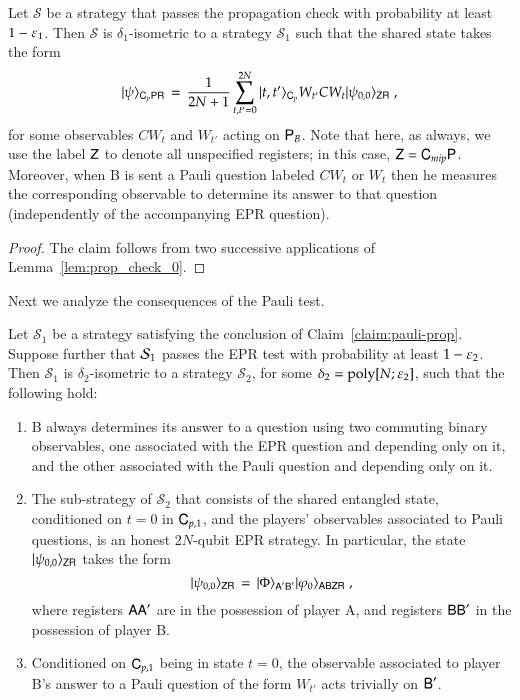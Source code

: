 \begin{claim}\label{claim:pauli-prop}
Let $\mathcal{S}$ be a strategy that passes the propagation check with probability at least $1 - \varepsilon_1$. Then $\mathcal{S}$ is $\delta_1$-isometric to a strategy $\mathcal{S}_1$ such that the shared state takes the form
\[ |\psi\rangle_{{\textsf{C}}_p {\textsf{PR}}} \,=\, \frac{1}{2N+1} \sum_{t,t'=0}^{2N} |t,t'\rangle_{{\textsf{C}}_p} W_{t'} CW_t | \psi_{0,0}\rangle_{{\textsf{ZR}}}\;, \]
for some observables $CW_t$ and $W_{t'}$ acting on ${\textsf{P}}_B$. Note that here, as always, we use the label ${\textsf{Z}}$ to denote all unspecified registers; in this case, ${\textsf{Z}} = {\textsf{C}}_{mip}{\textsf{P}}$. 
 Moreover, when B is sent a Pauli question labeled $CW_t$ or $W_t$ then he measures the corresponding observable to determine its answer to that question (independently of the accompanying EPR question). 
\end{claim}

\begin{proof}
The claim follows from two successive applications of Lemma~\ref{lem:prop_check_0}.
\end{proof}


Next we analyze the consequences of the Pauli test. 

\begin{claim}\label{claim:pauli-epr}
Let $\mathcal{S}_1$ be a strategy satisfying the conclusion of Claim~\ref{claim:pauli-prop}. Suppose further that $\mathcal{S}_1$ passes the EPR test with probability at least $1 - \varepsilon_2$. Then $\mathcal{S}_1$ is $\delta_2$-isometric to a strategy $\mathcal{S}_2$, for some $\delta_2 = \operatorname{poly}[N;\varepsilon_2]$, such that the following hold:
\begin{enumerate}
\item B always determines its answer to a question using two commuting binary observables, one associated with the EPR question and depending only on it, and the other associated with the Pauli question and depending only on it.  
\item The sub-strategy of $\mathcal{S}_2$ that consists of the shared entangled state, conditioned on $t=0$ in ${\mathsf{C}}_{p,1}$, and the players' observables associated to Pauli questions, is an honest $2N$-qubit EPR strategy. In particular, the state $|\psi_{0,0}\rangle_{{\textsf{ZR}}}$ takes the form 
\[ |\psi_{0,0}\rangle_{{\textsf{ZR}}} \,=\, |\Phi\rangle_{{\textsf{A}}'{\textsf{B}}'} |\varphi_0\rangle_{{\textsf{ABZR}}}\;,\]
where registers ${\textsf{A}}{\textsf{A}}'$ are in the possession of player A, and registers ${\textsf{B}}{\textsf{B}}'$ in the possession of player B. 
\item Conditioned on ${\textsf{C}}_{p,1}$ being in state $t=0$, the observable associated to player B's answer to a Pauli question of the form $W_{t'}$ acts trivially on ${\textsf{B}}'$. %
\end{enumerate}  
\end{claim}

